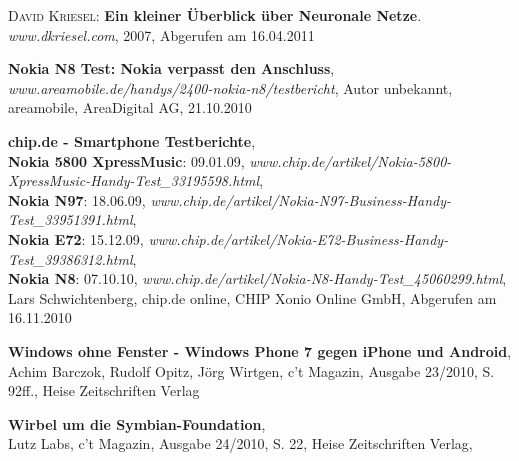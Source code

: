\begin{thebibliography}{---}


  \textsc{David Kriesel}: 
  \textbf{Ein kleiner Überblick über Neuronale Netze}.
  \emph{www.dkriesel.com}, 2007, Abgerufen am 16.04.2011





	
	\textbf{Nokia N8 Test: Nokia verpasst den Anschluss}, \\
	\emph{www.areamobile.de/handys/2400-nokia-n8/testbericht},
	Autor unbekannt, areamobile, AreaDigital AG, 21.10.2010
		
	\textbf{chip.de - Smartphone Testberichte},\\
	\textbf{Nokia 5800 XpressMusic}: 09.01.09, \emph{www.chip.de/artikel/Nokia-5800-XpressMusic-Handy-Test\_33195598.html},\\
	\textbf{Nokia N97}: 18.06.09, \emph{www.chip.de/artikel/Nokia-N97-Business-Handy-Test\_33951391.html},\\
	\textbf{Nokia E72}: 15.12.09, \emph{www.chip.de/artikel/Nokia-E72-Business-Handy-Test\_39386312.html},\\
	\textbf{Nokia N8}: 07.10.10, \emph{www.chip.de/artikel/Nokia-N8-Handy-Test\_45060299.html},\\
	Lars Schwichtenberg, chip.de online, CHIP Xonio Online GmbH, Abgerufen am 16.11.2010 
	
	\textbf{Windows ohne Fenster - Windows Phone 7 gegen iPhone und Android},\\
	Achim Barczok, Rudolf Opitz, Jörg Wirtgen, c't Magazin, Ausgabe 23/2010, S. 92ff., Heise Zeitschriften Verlag

	\textbf{Wirbel um die Symbian-Foundation},\\
	Lutz Labs, c't Magazin, Ausgabe 24/2010, S. 22, Heise Zeitschriften Verlag,
	
\end{thebibliography}

